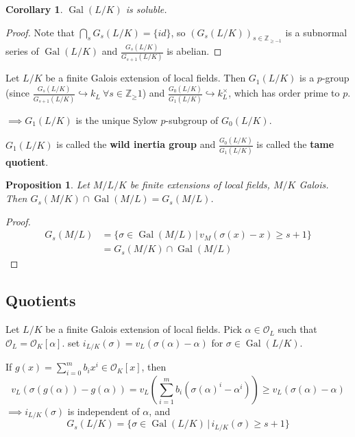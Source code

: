 \documentclass[a4paper]{article}
\newtheorem{prop}[definition]{Proposition}
\newtheorem{corollary}[definition]{Corollary}
\DeclareMathOperator{\Gal}{Gal}
\begin{document}
\begin{corollary}
	$\Gal(L/K)$ is soluble.
\end{corollary}
\begin{proof}
	Note that $\bigcap_s G_s(L/K) = \{id\}$,
	so $(G_s(L/K))_{s \in \mathbb{Z}_{\geq -1}}$ is a subnormal series of $\Gal(L/K)$
	and $\frac{G_s(L/K)}{G_{s+1}(L/K)}$ is abelian.
\end{proof}

Let $L/K$ be a finite Galois extension of local fields.
Then $G_1(L/K)$ is a $p$-group
(since $\frac{G_s(L/K)}{G_{s+1}(L/K)} \hookrightarrow k_L \ \forall s \in \mathbb{Z}_\geq 1$)
and $\frac{G_0(L/K)}{G_1(L/K)} \hookrightarrow k_L^\times$,
which has order prime to $p$.

$\implies G_1(L/K)$ is the unique Sylow $p$-subgroup of $G_0(L/K)$.

$G_1(L/K)$ is called the \textbf{wild inertia group}
and $\frac{G_0(L/K)}{G_1(L/K)}$ is called the \textbf{tame quotient}.

\begin{prop}
	Let $M/L/K$ be finite extensions of local fields, $M/K$ Galois.
	Then $G_s(M/K)\cap\Gal(M/L) = G_s(M/L)$.
\end{prop}
\begin{proof}
	\begin{align*}
		G_s(M/L) &= \{\sigma \in \Gal(M/L) \,|\, v_M(\sigma(x) - x) \geq s+1 \} \\
		&= G_s(M/K) \cap \Gal(M/L)
	\end{align*}
\end{proof}

\subsection{Quotients}
Let $L/K$ be a finite Galois extension of local fields.
Pick $\alpha \in \mathcal{O}_L$ such that $\mathcal{O}_L = \mathcal{O}_K[\alpha]$.
set $i_{L/K}(\sigma) = v_L(\sigma(\alpha) - \alpha)$ for $\sigma \in \Gal(L/K)$.

If $g(x) = \sum_{i=0}^m b_i x^i \in \mathcal{O}_K[x]$, then 
$$v_L(\sigma(g(\alpha)) - g(\alpha)) = v_L\left(\sum_{i=1}^{m}b_i(\sigma(\alpha)^i - \alpha^i)\right) \geq v_L(\sigma(\alpha) - \alpha)$$
$\implies i_{L/K}(\sigma)$ is independent of $\alpha$, and
$$G_s(L/K) = \{\sigma \in \Gal(L/K) \,|\, i_{L/K}(\sigma) \geq s+1 \}$$
\end{document}
